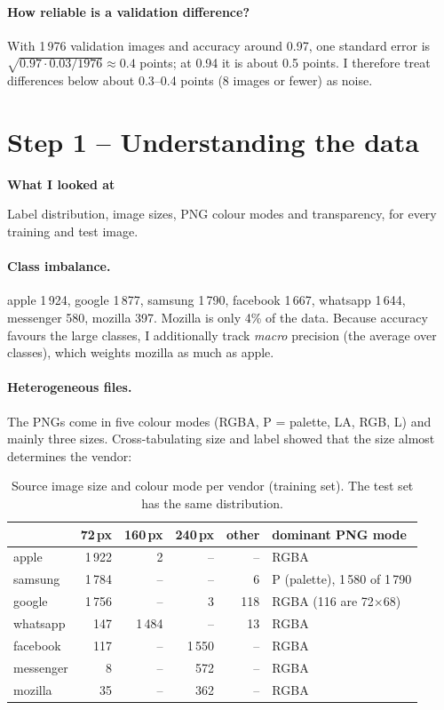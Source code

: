\documentclass[11pt,a4paper]{article}
\newenvironment{stepbox}[1]{\par\medskip\noindent\textbf{#1}\par\nopagebreak}{\par}
\begin{document}
\paragraph{How reliable is a validation difference?} With 1\,976 validation images and accuracy
around 0.97, one standard error is $\sqrt{0.97\cdot0.03/1976}\approx0.4$ points; at 0.94 it is about
0.5 points. I therefore treat differences below about 0.3--0.4 points (8 images or fewer) as noise.

\section{Step 1 -- Understanding the data}

\begin{stepbox}{What I looked at}
Label distribution, image sizes, PNG colour modes and transparency, for every training and test image.
\end{stepbox}

\paragraph{Class imbalance.} apple 1\,924, google 1\,877, samsung 1\,790, facebook 1\,667,
whatsapp 1\,644, messenger 580, mozilla 397. Mozilla is only 4\% of the data. Because accuracy
favours the large classes, I additionally track \emph{macro} precision (the average over classes),
which weights mozilla as much as apple.

\paragraph{Heterogeneous files.} The PNGs come in five colour modes (RGBA, P = palette, LA, RGB, L)
and mainly three sizes. Cross-tabulating size and label showed that the size almost determines the
vendor:

\begin{table}[H]
\centering\small
\begin{tabular}{lrrrrl}
\toprule
 & 72\,px & 160\,px & 240\,px & other & dominant PNG mode \\
\midrule
apple     & 1\,922 & 2 & -- & -- & RGBA \\
samsung   & 1\,784 & -- & -- & 6 & P (palette), 1\,580 of 1\,790 \\
google    & 1\,756 & -- & 3 & 118 & RGBA (116 are 72$\times$68) \\
whatsapp  & 147 & 1\,484 & -- & 13 & RGBA \\
facebook  & 117 & -- & 1\,550 & -- & RGBA \\
messenger & 8 & -- & 572 & -- & RGBA \\
mozilla   & 35 & -- & 362 & -- & RGBA \\
\bottomrule
\end{tabular}
\caption{Source image size and colour mode per vendor (training set). The test set has the same distribution.}
\end{table}
\end{document}
